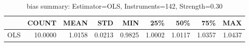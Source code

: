 \begin{table}[ht]
\centering
\caption{bias summary: Estimator=OLS, Instruments=142, Strength=0.30}
\begin{tabular}{lrrrrrrrr}
\toprule
 & COUNT & MEAN & STD & MIN & 25\% & 50\% & 75\% & MAX \\
\midrule
OLS & 10.0000 & 1.0158 & 0.0213 & 0.9825 & 1.0002 & 1.0117 & 1.0357 & 1.0437 \\
\bottomrule
\end{tabular}
\end{table}
